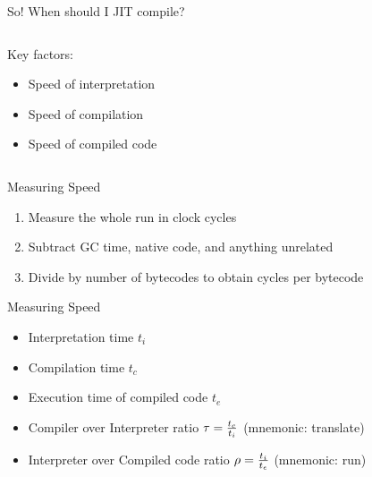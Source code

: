 \documentclass[
14pt,
aspectratio=169,
usenames,
dvipsnames,
x11names]{beamer}
\begin{document}
\begin{frame}{So! When should I JIT compile?}
  \begin{columns}
    \begin{column}{.4\linewidth}
      Key factors:
      \begin{itemize}  \setlength{\itemsep}{\fill}
      \item Speed of interpretation
      \item Speed of compilation
      \item Speed of compiled code
      \end{itemize}
    \end{column}
    \begin{column}{.5\linewidth}
      \centering
    \end{column}
  \end{columns}
\end{frame}

\begin{frame}{Measuring Speed}
  \begin{enumerate}  \setlength{\itemsep}{\fill}
  \item Measure the \alert{whole run} in \alert{clock cycles}
  \item \alert{Subtract} GC time, native code, and anything unrelated
  \item Divide by number of bytecodes to obtain \alert{cycles per bytecode}
  \end{enumerate}
\end{frame}

\begin{frame}{Measuring Speed}
  \begin{itemize}  \setlength{\itemsep}{\fill}
  \item Interpretation time \alert{$t_i$}
  \item Compilation time \alert{$t_c$}
  \item Execution time of compiled code \alert{$t_e$}
  \item Compiler over Interpreter ratio \alert{$\tau = {t_c \over t_i}$} (mnemonic: translate)
  \item Interpreter over Compiled code ratio \alert{$\rho = {t_i \over t_e}$} (mnemonic: run)
  \end{itemize}
\end{frame}
\end{document}
